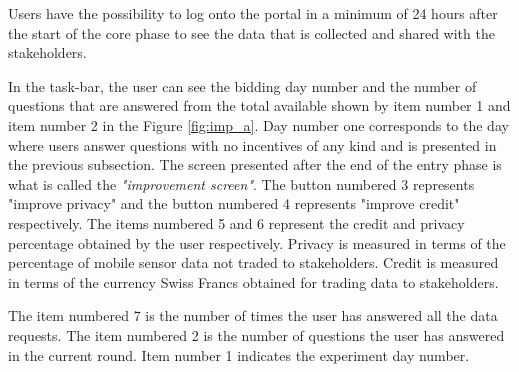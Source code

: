 Users have the possibility to log onto the portal in a minimum of 24 hours after the start of the core phase to see the data that is collected and shared with the stakeholders. 

In the task-bar, the user can see the bidding day number and the number of questions that are answered from the total available shown by item number 1 and item number 2 in the Figure \ref{fig:imp_a}. Day number one
corresponds to the day where users answer questions with no incentives of any kind and is presented in the previous subsection. The screen presented after the end of the entry phase is what is called the \textit{"improvement screen"}. 
The button numbered 3
represents "improve privacy" and the button numbered 4 represents "improve credit" respectively. The items numbered 5 and 6 represent the credit   and privacy percentage obtained by the user respectively. Privacy is measured in terms of the percentage of mobile sensor data not traded to stakeholders. Credit is measured in terms of the currency Swiss Francs obtained for trading data to stakeholders. 

The item numbered 7 is the number of times the user has answered all the data requests. The item numbered 2 is the number of questions the user has answered in the current round. Item number 1 indicates the experiment day number.



